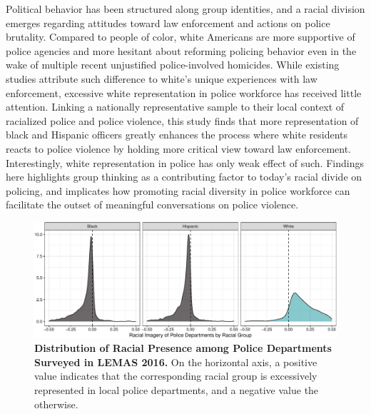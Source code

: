 \documentclass[
  11pt,
]{article}
\begin{document}
Political behavior has been structured along group identities, and a
racial division emerges regarding attitudes toward law enforcement and
actions on police brutality. Compared to people of color, white
Americans are more supportive of police agencies and more hesitant about
reforming policing behavior even in the wake of multiple recent
unjustified police-involved homicides. While existing studies attribute
such difference to white's unique experiences with law enforcement,
excessive white representation in police workforce has received little
attention. Linking a nationally representative sample to their local
context of racialized police and police violence, this study finds that
more representation of black and Hispanic officers greatly enhances the
process where white residents reacts to police violence by holding more
critical view toward law enforcement. Interestingly, white
representation in police has only weak effect of such. Findings here
highlights group thinking as a contributing factor to today's racial
divide on policing, and implicates how promoting racial diversity in
police workforce can facilitate the outset of meaningful conversations
on police violence.

\begin{figure}[t]

{\centering \includegraphics{paper_files/figure-pdf/fig-lemas-density-1.pdf}

}

\caption{\label{fig-lemas-density}\textbf{Distribution of Racial
Presence among Police Departments Surveyed in LEMAS 2016.} On the
horizontal axis, a positive value indicates that the corresponding
racial group is excessively represented in local police departments, and
a negative value the otherwise.}

\end{figure}
\end{document}
